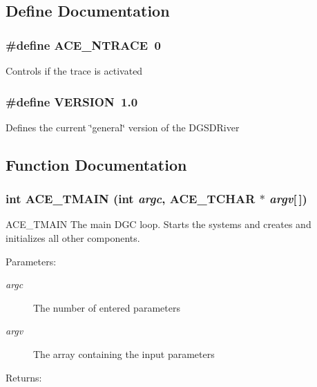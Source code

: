 \subsection{Define Documentation}
\subsubsection{\setlength{\rightskip}{0pt plus 5cm}\#define ACE\_\-NTRACE\ 0}\label{DGSDriver_8cpp_a1}


Controls if the trace is activated 
\subsubsection{\setlength{\rightskip}{0pt plus 5cm}\#define VERSION\ 1.0}\label{DGSDriver_8cpp_a0}


Defines the current \char`\"{}general\char`\"{} version of the DGSDRiver 

\subsection{Function Documentation}
\subsubsection{\setlength{\rightskip}{0pt plus 5cm}int ACE\_\-TMAIN (int {\em argc}, ACE\_\-TCHAR $\ast$ {\em argv}[$\,$])}\label{DGSDriver_8cpp_a2}


ACE\_\-TMAIN The main DGC loop. Starts the systems and creates and initializes all other components.

\begin{Desc}
\item[Parameters:]
\begin{description}
\item[{\em argc}]The number of entered parameters \item[{\em argv}]The array containing the input parameters\end{description}
\end{Desc}
\begin{Desc}
\item[Returns:]\end{Desc}
